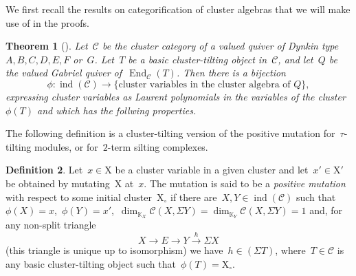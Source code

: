 \documentclass{amsart}
\newtheorem{theorem}{Theorem}[section]
\theoremstyle{definition}
\newtheorem{definition}[theorem]{Definition}
\newcommand{\Z}{\mathbb{Z}} %
\renewcommand{\b}[1]{{\boldsymbol{#1}}} %
\newcommand{\darkblue}{\color{darkblue}} %
\newcommand{\defn}[1]{\textsl{\darkblue #1}} %
\newcommand{\pg}[1]{\todo[color=green!30]{#1 \\ \hfill --- PG.}}
\newcommand{\cluster}{\mathrm{X}} %
\newcommand{\field}{\mathbb{K}}
\newcommand{\cat}{\mathcal{C}}
\newcommand{\susp}{\Sigma}
\newcommand{\End}[1]{\operatorname{End}_{#1}}
\newcommand{\Kg}{K_0^{\b{g}}}
\newcommand{\ind}{\operatorname{ind}}
\newcommand{\CC}{\phi}
\begin{document}
We first recall the results on categorification of cluster algebras that we will make use of in the proofs.
\begin{theorem}[]\pg{cite???}
\label{thm::categorification}
 Let~$\cat$ be the cluster category of a valued quiver of Dynkin type~$A,B,C,D,E,F$ or~$G$.  Let~$T$ be a basic cluster-tilting object in~$\cat$, and let~$Q$ be the valued Gabriel quiver of~$\End{\cat}(T)$.  Then there is a bijection
 \[
  \CC: \ind(\cat) \xrightarrow{} \{\textrm{cluster variables in the cluster algebra of~$Q$}\},
 \]
 expressing cluster variables as Laurent polynomials in the variables of the cluster~$\CC(T)$ and which has the follwing properties.
\end{theorem}

The following definition is a cluster-tilting version of the positive mutation for~$\tau$-tilting modules, or for~$2$-term silting complexes.
\begin{definition}
Let~$x\in\cluster$ be a cluster variable in a given cluster and let~$x'\in \cluster'$ be obtained by mutating~$\cluster$ at~$x$.
The mutation is said to be a \defn{positive mutation} with respect to some initial cluster~$\cluster_\circ$ if there are~$X,Y\in \ind(\cat)$ such that~$\CC(X)=x$,~$\CC(Y)=x'$,~$\dim_{\field_X}\cat(X, \susp Y) = \dim_{\field_Y}\cat(X, \susp Y) = 1$ and, for any non-split triangle
 \[
  X\xrightarrow{} E \xrightarrow{} Y \xrightarrow{h} \susp X 
 \]
(this triangle is unique up to isomorphism) we have~$h\in (\susp T)$, where~$T\in\cat$ is any basic cluster-tilting object such that~$\CC(T)=\cluster_\circ$.
\end{definition}
\end{document}
